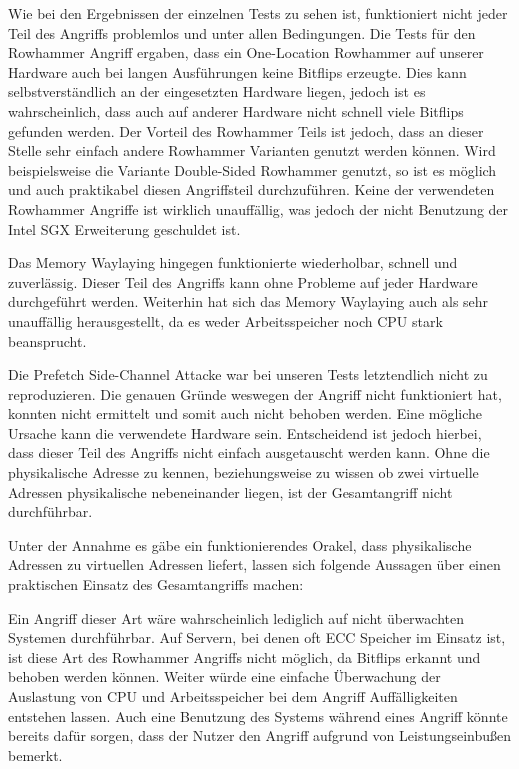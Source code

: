 Wie bei den Ergebnissen der einzelnen Tests zu sehen ist, funktioniert nicht jeder Teil des Angriffs problemlos und unter allen Bedingungen. Die Tests für den Rowhammer Angriff ergaben, dass ein One-Location Rowhammer auf unserer Hardware auch bei langen Ausführungen keine Bitflips erzeugte. Dies kann selbstverständlich an der eingesetzten Hardware liegen, jedoch ist es wahrscheinlich, dass auch auf anderer Hardware nicht schnell viele Bitflips gefunden werden. Der Vorteil des Rowhammer Teils ist jedoch, dass an dieser Stelle sehr einfach andere Rowhammer Varianten genutzt werden können. Wird beispielsweise die Variante Double-Sided Rowhammer genutzt, so ist es möglich und auch praktikabel diesen Angriffsteil durchzuführen. Keine der verwendeten Rowhammer Angriffe ist wirklich unauffällig, was jedoch der nicht Benutzung der Intel SGX Erweiterung geschuldet ist.

Das Memory Waylaying hingegen funktionierte wiederholbar, schnell und zuverlässig. Dieser Teil des Angriffs kann ohne Probleme auf jeder Hardware durchgeführt werden. Weiterhin hat sich das Memory Waylaying auch als sehr unauffällig herausgestellt, da es weder Arbeitsspeicher noch CPU stark beansprucht.

Die Prefetch Side-Channel Attacke war bei unseren Tests letztendlich nicht zu reproduzieren. Die genauen Gründe weswegen der Angriff nicht funktioniert hat, konnten nicht ermittelt und somit auch nicht behoben werden. Eine mögliche Ursache kann die verwendete Hardware sein. Entscheidend ist jedoch hierbei, dass dieser Teil des Angriffs nicht einfach ausgetauscht werden kann. Ohne die physikalische Adresse zu kennen, beziehungsweise zu wissen ob zwei virtuelle Adressen physikalische nebeneinander liegen, ist der Gesamtangriff nicht durchführbar.

Unter der Annahme es gäbe ein funktionierendes Orakel, dass physikalische Adressen zu virtuellen Adressen liefert, lassen sich folgende Aussagen über einen praktischen Einsatz des Gesamtangriffs machen:

Ein Angriff dieser Art wäre wahrscheinlich lediglich auf nicht überwachten Systemen durchführbar. Auf Servern, bei denen oft ECC Speicher im Einsatz ist, ist diese Art des Rowhammer Angriffs nicht möglich, da Bitflips erkannt und behoben werden können. Weiter würde eine einfache Überwachung der Auslastung von CPU und Arbeitsspeicher bei dem Angriff Auffälligkeiten entstehen lassen. Auch eine Benutzung des Systems während eines Angriff könnte bereits dafür sorgen, dass der Nutzer den Angriff aufgrund von Leistungseinbußen bemerkt.

